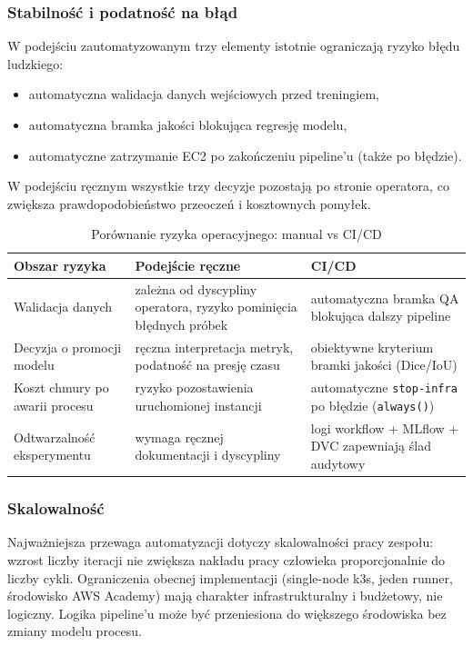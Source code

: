 \subsubsection{Stabilność i podatność na błąd}
\label{subsubsec:stabilnosc}

W podejściu zautomatyzowanym trzy elementy istotnie ograniczają ryzyko błędu ludzkiego:
\begin{itemize}
  \item automatyczna walidacja danych wejściowych przed treningiem,
  \item automatyczna bramka jakości blokująca regresję modelu,
  \item automatyczne zatrzymanie EC2 po zakończeniu pipeline'u (także po błędzie).
\end{itemize}

W podejściu ręcznym wszystkie trzy decyzje pozostają po stronie operatora, co zwiększa prawdopodobieństwo przeoczeń i kosztownych pomyłek.

\begin{table}[H]
\centering
\caption{Porównanie ryzyka operacyjnego: manual vs CI/CD}
\label{tab:ryzyko-porownanie}
\begin{tabular}{|p{4.3cm}|p{5.1cm}|p{5.1cm}|}
\hline
\textbf{Obszar ryzyka} & \textbf{Podejście ręczne} & \textbf{CI/CD} \\
\hline
Walidacja danych & zależna od dyscypliny operatora, ryzyko pominięcia błędnych próbek & automatyczna bramka QA blokująca dalszy pipeline \\
\hline
Decyzja o promocji modelu & ręczna interpretacja metryk, podatność na presję czasu & obiektywne kryterium bramki jakości (Dice/IoU) \\
\hline
Koszt chmury po awarii procesu & ryzyko pozostawienia uruchomionej instancji & automatyczne \texttt{stop-infra} po błędzie (\texttt{always()}) \\
\hline
Odtwarzalność eksperymentu & wymaga ręcznej dokumentacji i dyscypliny & logi workflow + MLflow + DVC zapewniają ślad audytowy \\
\hline
\end{tabular}
\end{table}

\subsubsection{Skalowalność}
\label{subsubsec:skalowalnosc}

Najważniejsza przewaga automatyzacji dotyczy skalowalności pracy zespołu: wzrost liczby iteracji nie zwiększa nakładu pracy człowieka proporcjonalnie do liczby cykli. Ograniczenia obecnej implementacji (single-node k3s, jeden runner, środowisko AWS Academy) mają charakter infrastrukturalny i budżetowy, nie logiczny. Logika pipeline'u może być przeniesiona do większego środowiska bez zmiany modelu procesu.

